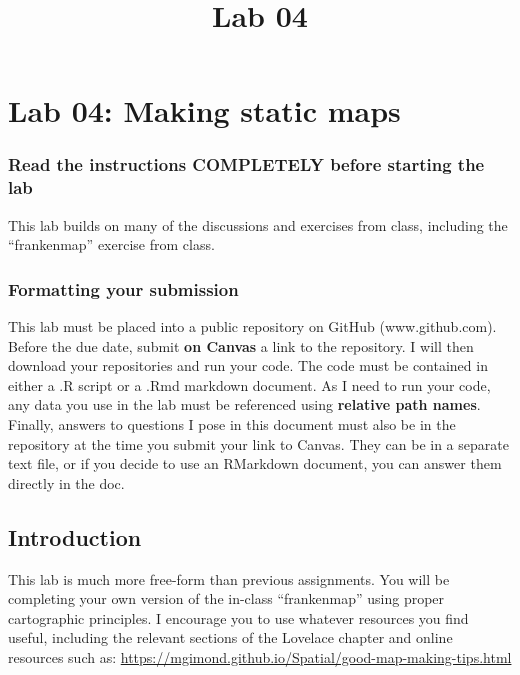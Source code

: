 \documentclass[]{article}
\title{Lab 04}
\author{}
\date{}
\makeatletter
\renewcommand{\maketitle}{\bgroup\vspace*{-1cm}\setlength{\parindent}{0pt}
\begin{flushleft}
  \@author
  
  \@date
  
\end{flushleft}\egroup
}
\makeatother
\begin{document}
\maketitle

\section{Lab 04: Making static maps}\label{lab-04-making-static-maps}

\subsubsection{Read the instructions COMPLETELY before starting the
lab}\label{read-the-instructions-completely-before-starting-the-lab}

This lab builds on many of the discussions and exercises from class,
including the ``frankenmap'' exercise from class.

\subsubsection{Formatting your
submission}\label{formatting-your-submission}

This lab must be placed into a public repository on GitHub
(www.github.com). Before the due date, submit \textbf{on Canvas} a link
to the repository. I will then download your repositories and run your
code. The code must be contained in either a .R script or a .Rmd
markdown document. As I need to run your code, any data you use in the
lab must be referenced using \textbf{relative path names}. Finally,
answers to questions I pose in this document must also be in the
repository at the time you submit your link to Canvas. They can be in a
separate text file, or if you decide to use an RMarkdown document, you
can answer them directly in the doc.

\subsection{Introduction}\label{introduction}

This lab is much more free-form than previous assignments. You will be
completing your own version of the in-class ``frankenmap'' using proper
cartographic principles. I encourage you to use whatever resources you
find useful, including the relevant sections of the Lovelace chapter and
online resources such as:
\url{https://mgimond.github.io/Spatial/good-map-making-tips.html}
\end{document}

